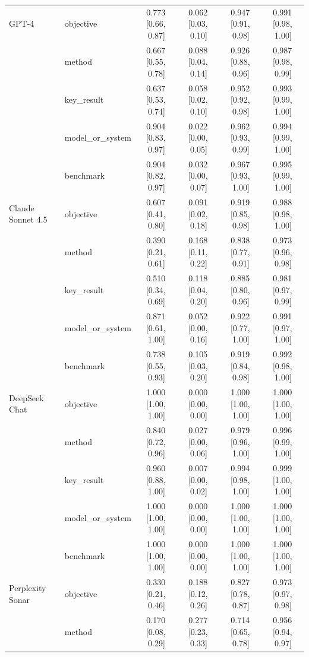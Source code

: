 {\begin{longtable}{@{}p{3.2cm}lcccc@{}}
  GPT-4 & objective & 0.773\,[0.66,\,0.87] & 0.062\,[0.03,\,0.10] & 0.947\,[0.91,\,0.98] & 0.991\,[0.98,\,1.00] \\
   & method & 0.667\,[0.55,\,0.78] & 0.088\,[0.04,\,0.14] & 0.926\,[0.88,\,0.96] & 0.987\,[0.98,\,0.99] \\
   & key\_result & 0.637\,[0.53,\,0.74] & 0.058\,[0.02,\,0.10] & 0.952\,[0.92,\,0.98] & 0.993\,[0.99,\,1.00] \\
   & model\_or\_system & 0.904\,[0.83,\,0.97] & 0.022\,[0.00,\,0.05] & 0.962\,[0.93,\,0.99] & 0.994\,[0.99,\,1.00] \\
   & benchmark & 0.904\,[0.82,\,0.97] & 0.032\,[0.00,\,0.07] & 0.967\,[0.93,\,1.00] & 0.995\,[0.99,\,1.00] \\
  \midrule
  Claude Sonnet 4.5 & objective & 0.607\,[0.41,\,0.80] & 0.091\,[0.02,\,0.18] & 0.919\,[0.85,\,0.98] & 0.988\,[0.98,\,1.00] \\
   & method & 0.390\,[0.21,\,0.61] & 0.168\,[0.11,\,0.22] & 0.838\,[0.77,\,0.91] & 0.973\,[0.96,\,0.98] \\
   & key\_result & 0.510\,[0.34,\,0.69] & 0.118\,[0.04,\,0.20] & 0.885\,[0.80,\,0.96] & 0.981\,[0.97,\,0.99] \\
   & model\_or\_system & 0.871\,[0.61,\,1.00] & 0.052\,[0.00,\,0.16] & 0.922\,[0.77,\,1.00] & 0.991\,[0.97,\,1.00] \\
   & benchmark & 0.738\,[0.55,\,0.93] & 0.105\,[0.03,\,0.20] & 0.919\,[0.84,\,0.98] & 0.992\,[0.98,\,1.00] \\
  \midrule
  DeepSeek Chat & objective & 1.000\,[1.00,\,1.00] & 0.000\,[0.00,\,0.00] & 1.000\,[1.00,\,1.00] & 1.000\,[1.00,\,1.00] \\
   & method & 0.840\,[0.72,\,0.96] & 0.027\,[0.00,\,0.06] & 0.979\,[0.96,\,1.00] & 0.996\,[0.99,\,1.00] \\
   & key\_result & 0.960\,[0.88,\,1.00] & 0.007\,[0.00,\,0.02] & 0.994\,[0.98,\,1.00] & 0.999\,[1.00,\,1.00] \\
   & model\_or\_system & 1.000\,[1.00,\,1.00] & 0.000\,[0.00,\,0.00] & 1.000\,[1.00,\,1.00] & 1.000\,[1.00,\,1.00] \\
   & benchmark & 1.000\,[1.00,\,1.00] & 0.000\,[0.00,\,0.00] & 1.000\,[1.00,\,1.00] & 1.000\,[1.00,\,1.00] \\
  \midrule
  Perplexity Sonar & objective & 0.330\,[0.21,\,0.46] & 0.188\,[0.12,\,0.26] & 0.827\,[0.78,\,0.87] & 0.973\,[0.97,\,0.98] \\
   & method & 0.170\,[0.08,\,0.29] & 0.277\,[0.23,\,0.33] & 0.714\,[0.65,\,0.78] & 0.956\,[0.94,\,0.97] \\

\end{longtable}}
